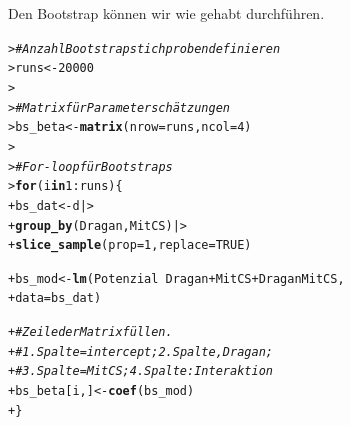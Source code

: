 \documentclass[oneside, 10pt]{book}\usepackage[]{graphicx}\usepackage[]{xcolor}
\makeatletter
\newcommand{\hlnum}[1]{\textcolor[rgb]{0.686,0.059,0.569}{#1}}%
\newcommand{\hlcom}[1]{\textcolor[rgb]{0.678,0.584,0.686}{\textit{#1}}}%
\newcommand{\hlopt}[1]{\textcolor[rgb]{0,0,0}{#1}}%
\newcommand{\hlstd}[1]{\textcolor[rgb]{0.345,0.345,0.345}{#1}}%
\newcommand{\hlkwa}[1]{\textcolor[rgb]{0.161,0.373,0.58}{\textbf{#1}}}%
\newcommand{\hlkwb}[1]{\textcolor[rgb]{0.69,0.353,0.396}{#1}}%
\newcommand{\hlkwc}[1]{\textcolor[rgb]{0.333,0.667,0.333}{#1}}%
\newcommand{\hlkwd}[1]{\textcolor[rgb]{0.737,0.353,0.396}{\textbf{#1}}}%
\newenvironment{kframe}{%
 \def\at@end@of@kframe{}%
 \ifinner\ifhmode%
  \def\at@end@of@kframe{\end{minipage}}%
  \begin{minipage}{\columnwidth}%
 \fi\fi%
 \def\FrameCommand##1{\hskip\@totalleftmargin \hskip-\fboxsep
 \colorbox{shadecolor}{##1}\hskip-\fboxsep
     \hskip-\linewidth \hskip-\@totalleftmargin \hskip\columnwidth}%
 \MakeFramed {\advance\hsize-\width
   \@totalleftmargin\z@ \linewidth\hsize
   \@setminipage}}%
 {\par\unskip\endMakeFramed%
 \at@end@of@kframe}
\newenvironment{knitrout}{}{} %
\makeatother
\begin{document}
Den Bootstrap können wir wie gehabt durchführen.
\begin{knitrout}
\color{fgcolor}\begin{kframe}
\begin{alltt}
\hlstd{> }\hlcom{# Anzahl Bootstrapstichproben definieren}
\hlstd{> }\hlstd{runs} \hlkwb{<-} \hlnum{20000}
\hlstd{> }
\hlstd{> }\hlcom{# Matrix für Parameterschätzungen}
\hlstd{> }\hlstd{bs_beta} \hlkwb{<-} \hlkwd{matrix}\hlstd{(}\hlkwc{nrow} \hlstd{= runs,} \hlkwc{ncol} \hlstd{=} \hlnum{4}\hlstd{)}
\hlstd{> }
\hlstd{> }\hlcom{# For-loop für Bootstraps}
\hlstd{> }\hlkwa{for} \hlstd{(i} \hlkwa{in} \hlnum{1}\hlopt{:}\hlstd{runs) \{}
\hlstd{+ }  \hlstd{bs_dat} \hlkwb{<-} \hlstd{d |>}
\hlstd{+ }    \hlkwd{group_by}\hlstd{(Dragan, MitCS) |>}
\hlstd{+ }    \hlkwd{slice_sample}\hlstd{(}\hlkwc{prop} \hlstd{=} \hlnum{1}\hlstd{,} \hlkwc{replace} \hlstd{=} \hlnum{TRUE}\hlstd{)}

\hlstd{+ }  \hlstd{bs_mod} \hlkwb{<-} \hlkwd{lm}\hlstd{(Potenzial} \hlopt{~} \hlstd{Dragan} \hlopt{+} \hlstd{MitCS} \hlopt{+} \hlstd{DraganMitCS,}
\hlstd{+ }               \hlkwc{data} \hlstd{= bs_dat)}

\hlstd{+ }  \hlcom{# Zeile der Matrix füllen.}
\hlstd{+ }  \hlcom{# 1. Spalte = intercept; 2. Spalte, Dragan;}
\hlstd{+ }  \hlcom{# 3. Spalte = MitCS; 4. Spalte: Interaktion}
\hlstd{+ }  \hlstd{bs_beta[i, ]} \hlkwb{<-} \hlkwd{coef}\hlstd{(bs_mod)}
\hlstd{+ }\hlstd{\}}
\end{alltt}
\end{kframe}
\end{knitrout}
\end{document}
